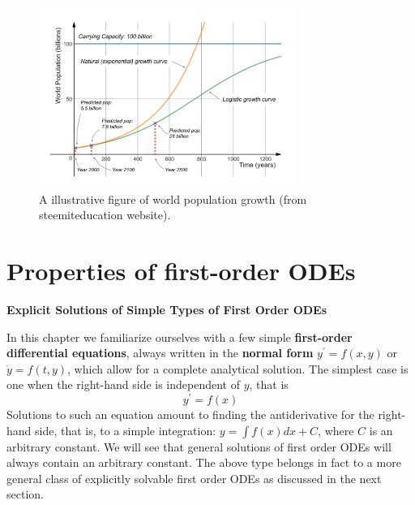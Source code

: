 \documentclass[11pt,a4paper,twoside]{article}
\begin{document}
	\begin{figure}[!h]
		\centering
			\includegraphics[width=0.75\textwidth]{steemiteducation.PNG}
			\caption{A illustrative figure of world population growth (from steemiteducation website).}
	\end{figure}

	\pagestyle{fancy}
	\fancyhead[LE,RO]{\thepage}
	\fancyhead[RE]{\nouppercase \leftmark}
	\fancyhead[LO]{\nouppercase \rightmark}

	\section{Properties of first-order ODEs}
	\textbf{Explicit Solutions of Simple Types of First Order ODEs}\par 
	In this chapter we familiarize ourselves with a few simple \textbf{first-order differential equations}, always written in the \textbf{normal form} $y^\prime = f(x, y)$ or $\dot{y} = f(t, y)$, which allow for a complete analytical solution. The simplest case is one when the right-hand side is independent of $y$, that is
	$$
	y^\prime = f(x)
	$$
	Solutions to such an equation amount to finding the antiderivative for the right-hand side, that is, to a simple integration: $y = \int f(x) dx + C$, where $C$ is an arbitrary constant. We will see that general solutions of first order ODEs will always contain an arbitrary constant. The above type belongs in fact to a more general class of explicitly solvable first order ODEs as discussed in the next section.
\end{document}
